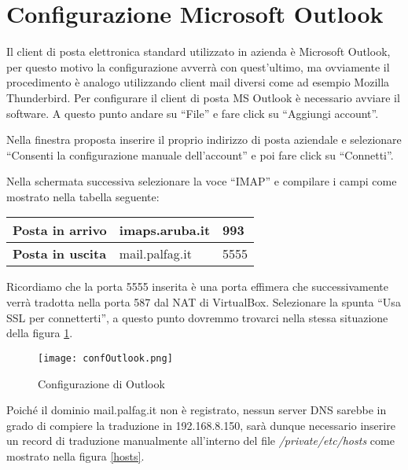 \section{Configurazione Microsoft Outlook}
Il client di posta elettronica standard utilizzato in azienda è Microsoft Outlook, 
per questo motivo la configurazione avverrà con quest'ultimo, 
ma ovviamente il procedimento è analogo utilizzando client mail diversi come ad esempio Mozilla Thunderbird.
Per configurare il client di posta MS Outlook è necessario avviare il software.
A questo punto andare su ``File'' e fare click su ``Aggiungi account''.

Nella finestra proposta inserire il proprio indirizzo di posta aziendale e selezionare ``Consenti la configurazione
manuale dell'account'' e poi fare click su ``Connetti''.

Nella schermata successiva selezionare la voce ``IMAP'' e compilare i campi come mostrato nella tabella seguente:


\begin{table}[htp]
    \centering
    \begin{tabular}{|l|l|l|}
    \hline
    \rowcolor[HTML]{EFEFEF} 
    \textbf{Posta in arrivo} & imaps.aruba.it & 993  \\ \hline
    \textbf{Posta in uscita} & mail.palfag.it & 5555 \\ \hline
    \end{tabular}%
    \end{table}

    Ricordiamo che la porta 5555 inserita è una porta effimera che successivamente verrà tradotta nella porta 587
    dal NAT di VirtualBox.
    Selezionare la spunta ``Usa SSL per connetterti'', a questo punto dovremmo trovarci nella stessa situazione
    della figura \ref{confOutlook}.

        \begin{figure}[htp]
            \centering
            \texttt{[image: confOutlook.png]}
            \caption{Configurazione di Outlook}\label{confOutlook}
        \end{figure}        
    

    Poiché il dominio mail.palfag.it non è registrato, 
    nessun server DNS sarebbe in grado di compiere la traduzione in 192.168.8.150, 
    sarà dunque necessario inserire un record di traduzione manualmente all’interno del file \textit{/private/etc/hosts} 
    come mostrato nella figura \ref{hosts}.

